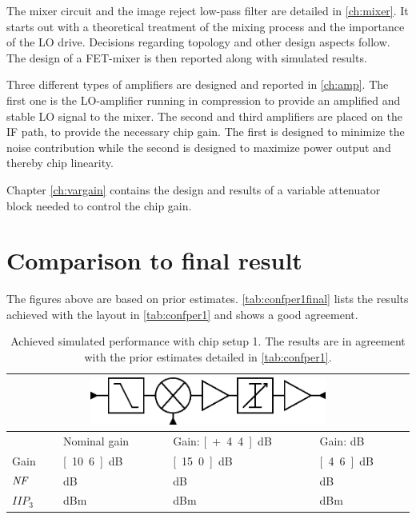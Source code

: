 		The mixer circuit and the image reject low-pass filter are detailed in \autoref{ch:mixer}. It starts out with a theoretical treatment of the mixing process and the importance of the LO drive. Decisions regarding topology and other design aspects follow. The design of a FET-mixer is then reported along with simulated results.
		
		Three different types of amplifiers are designed and reported in \autoref{ch:amp}. The first one is the LO-amplifier running in compression to provide an amplified and stable LO signal to the mixer. The second and third amplifiers are placed on the IF path, to provide the necessary chip gain. The first is designed to minimize the noise contribution while the second is designed to maximize power output and thereby chip linearity.
		
		Chapter \ref{ch:vargain} contains the design and results of a variable attenuator block needed to control the chip gain.
		
	\section{Comparison to final result}
		The figures above are based on prior estimates. \autoref{tab:confper1final} lists the results achieved with the layout in \autoref{tab:confper1} and shows a good agreement.
		
		\begin{table}[hpt!]
			\caption[Achieved simulated performance with chip setup 1.]{Achieved simulated performance with chip setup 1. The results are in agreement with the prior estimates detailed in \autoref{tab:confper1}.}
			\label{tab:confper1final}
			\centering
			\begin{tabular}{ l l l l }
				\multicolumn{4}{c}{\includegraphics[width=0.6\textwidth]{fig/system/sys1}} \\\toprule
				& Nominal gain & Gain: \unit[+4.4]{dB} & Gain: \unit[-6]{dB} \\\midrule
				Gain & \unit[10.6]{dB} & \unit[15.0]{dB} & \unit[4.6]{dB} \\
				$\emph{NF}$ & \unit[11]{dB} & \unit[10]{dB} & \unit[13]{dB} \\
				$IIP_3$ & \unit[20]{dBm} & \unit[17]{dBm} & \unit[21]{dBm}  \\\bottomrule
			\end{tabular}
		\end{table}